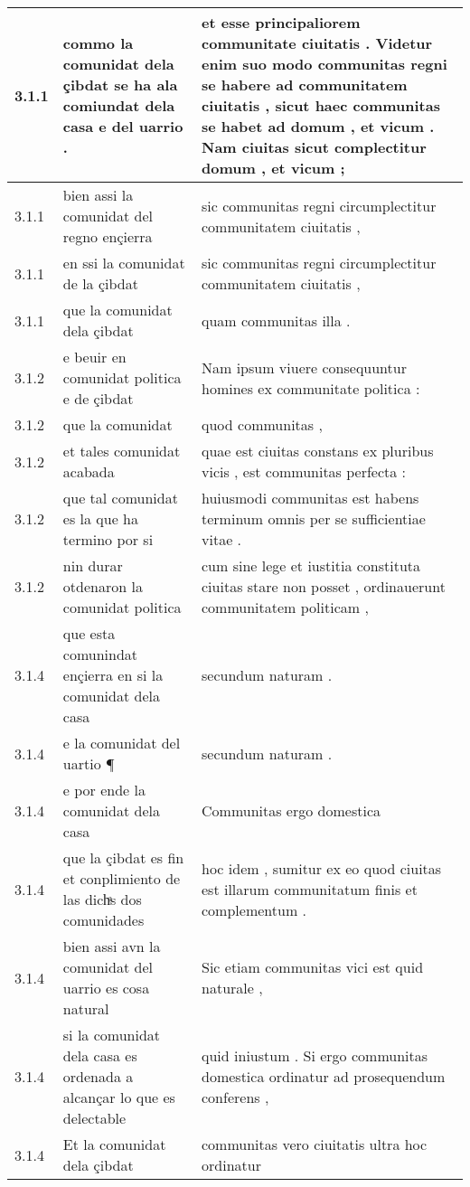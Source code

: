 \begin{tabular}{|p{1cm}|p{6.5cm}|p{6.5cm}|}
3.1.1 & commo la comunidat dela çibdat se ha ala comiundat dela casa e del uarrio . & et esse principaliorem communitate ciuitatis . Videtur enim suo modo communitas regni se habere ad communitatem ciuitatis , sicut haec communitas se habet ad domum , et vicum . Nam ciuitas sicut complectitur domum , et vicum ; \\\hline
3.1.1 & bien assi la comunidat del regno ençierra & sic communitas regni circumplectitur communitatem ciuitatis , \\\hline
3.1.1 & en ssi la comunidat de la çibdat & sic communitas regni circumplectitur communitatem ciuitatis , \\\hline
3.1.1 & que la comunidat dela çibdat & quam communitas illa . \\\hline
3.1.2 & e beuir en comunidat politica e de çibdat & Nam ipsum viuere consequuntur homines ex communitate politica : \\\hline
3.1.2 & que la comunidat & quod communitas , \\\hline
3.1.2 & et tales comunidat acabada & quae est ciuitas constans ex pluribus vicis , est communitas perfecta : \\\hline
3.1.2 & que tal comunidat es la que ha termino por si & huiusmodi communitas est habens terminum omnis per se sufficientiae vitae . \\\hline
3.1.2 & nin durar otdenaron la comunidat politica & cum sine lege et iustitia constituta ciuitas stare non posset , ordinauerunt communitatem politicam , \\\hline
3.1.4 & que esta comunindat ençierra en si la comunidat dela casa & secundum naturam . \\\hline
3.1.4 & e la comunidat del uartio ¶ & secundum naturam . \\\hline
3.1.4 & e por ende la comunidat dela casa & Communitas ergo domestica \\\hline
3.1.4 & que la çibdat es fin et conplimiento de las dichͣs dos comunidades & hoc idem , sumitur ex eo quod ciuitas est illarum communitatum finis et complementum . \\\hline
3.1.4 & bien assi avn la comunidat del uarrio es cosa natural & Sic etiam communitas vici est quid naturale , \\\hline
3.1.4 & si la comunidat dela casa es ordenada a alcançar lo que es delectable & quid iniustum . Si ergo communitas domestica ordinatur ad prosequendum conferens , \\\hline
3.1.4 & Et la comunidat dela çibdat & communitas vero ciuitatis ultra hoc ordinatur \\\hline

\end{tabular}
